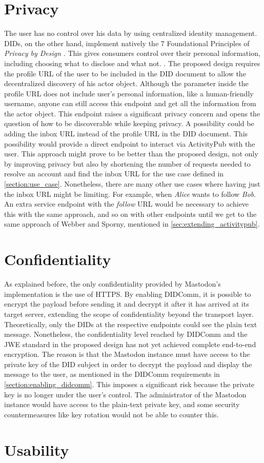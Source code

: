\section{Privacy}
The user has no control over his data by using centralized identity management. DIDs, on the other hand,  implement natively the 7 Foundational Principles of \emph{Privacy by Design} \cite{cavoukian_2006}. This gives consumers control over their personal information, including choosing what to disclose and what not. \cite{sporny_longley_sabadello_reed_steele_2021}. The proposed design requires the profile URL of the user to be included in the DID document to allow the decentralized discovery of his actor object. Although the parameter inside the profile URL does not include user's personal information, like a human-friendly username, anyone can still access this endpoint and get all the information from the actor object. This endpoint raises a significant privacy concern and opens the question of how to be discoverable while keeping privacy. A possibility could be adding the inbox URL instead of the profile URL in the DID document. This possibility would provide a direct endpoint to interact via ActivityPub with the user. This approach might prove to be better than the proposed design, not only by improving privacy but also by shortening the number of requests needed to resolve an account and find the inbox URL for the use case defined in \autoref{section:use_case}. Nonetheless, there are many other use cases where having just the inbox URL might be limiting. For example, when \emph{Alice} wants to follow \emph{Bob}. An extra service endpoint with the \emph{follow} URL would be necessary to achieve this with the same approach, and so on with other endpoints until we get to the same approach of Webber and Sporny, mentioned in \autoref{sec:extending_activitypub}. 


\section{Confidentiality}
As explained before, the only confidentiality provided by Mastodon's implementation is the use of HTTPS. By enabling DIDComm, it is possible to encrypt the payload before sending it and decrypt it after it has arrived at its target server, extending the scope of confidentiality beyond the transport layer. Theoretically, only the DIDs at the respective endpoints could see the plain text message. 
Nonetheless, the confidentiality level reached by DIDComm and the JWE standard in the proposed design has not yet achieved complete end-to-end encryption. The reason is that the Mastodon instance must have access to the private key of the DID subject in order to decrypt the payload and display the message to the user, as mentioned in the DIDComm requirements in \autoref{section:enabling_didcomm}. This imposes a significant risk because the private key is no longer under the user's control. The administrator of the Mastodon instance would have access to the plain-text private key, and some security countermeasures like key rotation would not be able to counter this. 


\section{Usability}
